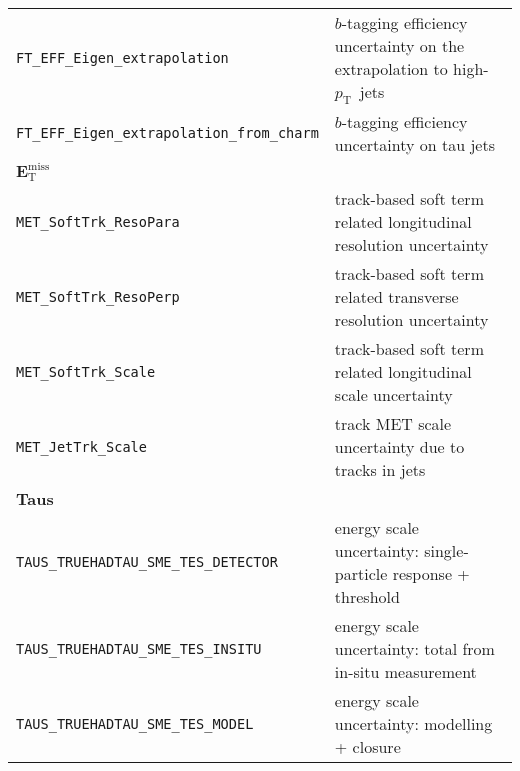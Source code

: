 {\begin{xltabular}{\textwidth}{XL}
  \texttt{FT\_EFF\_Eigen\_extrapolation} & $b$-tagging efficiency uncertainty on
  the extrapolation to high-$p_{\mathrm{T}}$\ jets \\
  \texttt{FT\_EFF\_Eigen\_extrapolation\_from\_charm} & $b$-tagging efficiency
  uncertainty on tau jets \\
  {\bfseries $\bm{E}_{\mathrm{T}}^{\text{miss}}$}&\\
  \texttt{MET\_SoftTrk\_ResoPara} & track-based soft term related longitudinal
  resolution uncertainty \\
  \texttt{MET\_SoftTrk\_ResoPerp} &  track-based soft term related transverse
  resolution uncertainty \\
  \texttt{MET\_SoftTrk\_Scale} & track-based soft term related longitudinal
  scale uncertainty \\ 
  \texttt{MET\_JetTrk\_Scale} & track MET scale uncertainty due to tracks in
  jets \\ 
  {\bfseries Taus}&\\
  \texttt{TAUS\_TRUEHADTAU\_SME\_TES\_DETECTOR} & energy scale uncertainty:
  single-particle response + threshold \\ 
  \texttt{TAUS\_TRUEHADTAU\_SME\_TES\_INSITU} & energy scale uncertainty: total
  from in-situ measurement \\
  \texttt{TAUS\_TRUEHADTAU\_SME\_TES\_MODEL} & energy scale uncertainty:
  modelling + closure \\ 
\end{xltabular}}